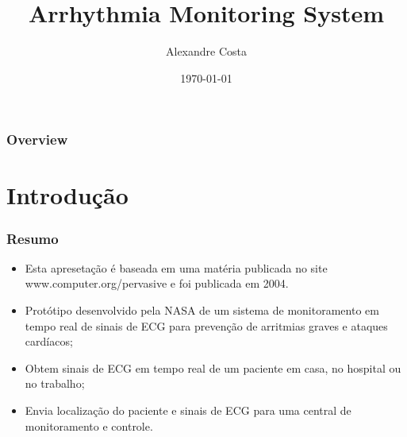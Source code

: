 \documentclass{beamer}
\title[AMS]{Arrhythmia Monitoring System} %
\author{Alexandre Costa} %
\institute[UFPEL] %
{
Universidade Federal de Pelotas \\ %
\medskip
\textit{alexandre.gcosta@gmail.com} %
}
\date{\today} %
\begin{document}
\begin{frame}
\titlepage %
\end{frame}

\begin{frame}
\frametitle{Overview} %
\tableofcontents %
\end{frame}


\section{Introdução}

\begin{frame}
	\frametitle{Resumo}
	\begin{itemize}
		\item Esta apresetação é baseada em uma matéria publicada no site www.computer.org/pervasive e foi publicada em 2004.
		\item Protótipo desenvolvido pela NASA de um sistema de monitoramento em tempo real de sinais de ECG para prevenção de arritmias graves e ataques cardíacos;
		\item Obtem sinais de ECG em tempo real de um paciente em casa, no hospital ou no trabalho;
		\item Envia localização do paciente e sinais de ECG para uma central de monitoramento e controle.
	\end{itemize}
\end{frame}


\end{document}
